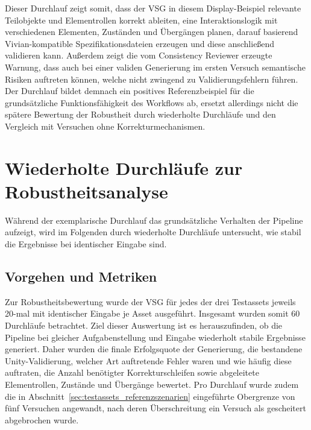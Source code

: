 Dieser Durchlauf zeigt somit, dass der VSG in diesem Display-Beispiel relevante Teilobjekte und Elementrollen korrekt ableiten, eine Interaktionslogik mit verschiedenen Elementen, Zuständen und Übergängen planen, darauf basierend Vivian-kompatible Spezifikationsdateien erzeugen und diese anschließend validieren kann. Außerdem zeigt die vom Consistency Reviewer erzeugte Warnung, dass auch bei einer validen Generierung im ersten Versuch semantische Risiken auftreten können, welche nicht zwingend zu Validierungsfehlern führen. Der Durchlauf bildet demnach ein positives Referenzbeispiel für die grundsätzliche Funktionsfähigkeit des Workflows ab, ersetzt allerdings nicht die spätere Bewertung der Robustheit durch wiederholte Durchläufe und den Vergleich mit Versuchen ohne Korrekturmechanismen.

\section{Wiederholte Durchläufe zur Robustheitsanalyse}

Während der exemplarische Durchlauf das grundsätzliche Verhalten der Pipeline aufzeigt, wird im Folgenden durch wiederholte Durchläufe untersucht, wie stabil die Ergebnisse bei identischer Eingabe sind.

\subsection{Vorgehen und Metriken}

Zur Robustheitsbewertung wurde der VSG für jedes der drei Testassets jeweils 20-mal mit identischer Eingabe je Asset ausgeführt. Insgesamt wurden somit 60 Durchläufe betrachtet. Ziel dieser Auswertung ist es herauszufinden, ob die Pipeline bei gleicher Aufgabenstellung und Eingabe wiederholt stabile Ergebnisse generiert. Daher wurden die finale Erfolgsquote der Generierung, die bestandene Unity-Validierung, welcher Art auftretende Fehler waren und wie häufig diese auftraten, die Anzahl benötigter Korrekturschleifen sowie abgeleitete Elementrollen, Zustände und Übergänge bewertet. Pro Durchlauf wurde zudem die in Abschnitt~\ref{sec:testassets_referenzszenarien} eingeführte Obergrenze von fünf Versuchen angewandt, nach deren Überschreitung ein Versuch als gescheitert abgebrochen wurde.

